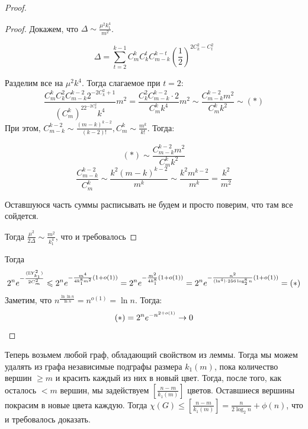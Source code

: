 \begin{proof}
\begin{proof}
            Докажем, что \(\Delta \sim \frac{\mu^2 k_1^4}{m^2} \).

            \[\Delta = \sum_{t = 2}^{k - 1}C_m^kC_k^tC_{m - k}^{k - t}\left( \frac{1}{2} \right)^{2C_k^2 - C_t^2}\]
            
            Разделим все на \(\mu^2k^4\). Тогда слагаемое при \(t = 2\):
            \[\frac{C_m^kC_k^2C_{m - k}^{k - 2}2^{-2C_k^2 + 1}}{\left( C_m^k \right)^22^{-2C_k^2}k^4}m^2 = \frac{C_k^2C_{m - k}^{k - 2}\cdot 2}{C_m^kk^4}m^2 \sim \frac{C_{m - k}^{k - 2}m^2}{C_m^kk^2} \sim (*)\]
            При этом, \(C_{m - k}^{k - 2} \sim \frac{(m - k)^{k - 2}}{(k - 2)!}, C_m^k \sim \frac{m^k}{k!}\). Тогда:

            \[(*) \sim \frac{C_{m - k}^{k - 2}m^2}{C_m^k k^2}\]
            \[\frac{C_{m - k}^{k - 2}}{C_m^k} \sim \frac{k^2(m - k)^{k - 2}}{m^k} \sim \frac{k^2m^{k - 2}}{m^k} = \frac{k^2}{m^2}\]

            Оставшуюся часть суммы расписывать не будем и просто поверим, что там все сойдется.

            Тогда \(\frac{\mu^2}{2\Delta} \sim \frac{m^2}{k_1^4}\), что и требовалось
        \end{proof}

        Тогда
        \[2^n e^{-\frac{(\mathbb{E} Y_{k_1}^2)}{2C_m^2}} \leqslant 2^ne^{-\frac{m^4}{4k_1^8m^2}(1 + o(1))} = 2^ne^{-\frac{m^2}{4k_1^8}(1 + o(1))} = 2^ne^{-\frac{n^2}{(\ln^4)\cdot 256 \log_2^8n}(1 + o(1))} = (*)\]
        Заметим, что \(n^{\frac{\ln\ln n}{\ln n}} = n^{o(1)} = \ln n\). Тогда:
        \[(*) = 2^ne^{-n^{2 + o(1)}} \rightarrow 0\]
    \end{proof}
    Теперь возьмем любой граф, обладающий свойством из леммы. Тогда мы можем удалять из графа независимые подграфы размера \(k_1(m)\), пока количество вершин \(\ge m\) и красить каждый из них в новый цвет. Тогда, после того, как осталось \(< m\) вершин, мы задействуем \(\left[ \frac{n - m}{k_1(m)} \right]\) цветов. Оставшиеся вершины покрасим в новые цвета каждую. Тогда \(\chi(G) \le \left[ \frac{n - m}{k_1(m)} \right] = \frac{n}{2\log_2n} + \phi(n)\), что и требовалось доказать.